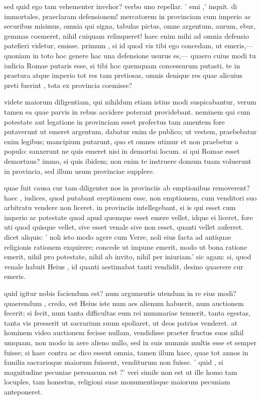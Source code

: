  sed quid ego tam vehementer invehor? verbo uno repellar. ' emi ,' inquit. di immortales, praeclaram defensionem! mercatorem in provinciam cum imperio ac securibus misimus, omnia qui signa, tabulas pictas, omne argentum, aurum, ebur, gemmas coemeret, nihil cuiquam relinqueret! haec enim mihi ad omnia defensio patefieri videtur, emisse. primum , si id quod vis tibi ego concedam, ut emeris,—quoniam in toto hoc genere hac una defensione usurus es,— quaero cuius modi tu iudicia Romae putaris esse, si tibi hoc quemquam concessurum putasti, te in praetura atque imperio tot res tam pretiosas, omnis denique res quae alicuius preti fuerint , tota ex provincia coemisse?

 videte maiorum diligentiam, qui nihildum etiam istius modi suspicabantur, verum tamen ea quae parvis in rebus accidere poterant providebant. neminem qui cum potestate aut legatione in provinciam esset profectus tam amentem fore putaverunt ut emeret argentum, dabatur enim de publico; ut vestem, praebebatur enim legibus; mancipium putarunt, quo et omnes utimur et non praebetur a populo: sanxerunt ne quis emeret nisi in demortui locum. si qui Romae esset demortuus? immo, si quis ibidem; non enim te instruere domum tuam voluerunt in provincia, sed illum usum provinciae supplere.

 quae fuit causa cur tam diligenter nos in provinciis ab emptionibus removerent? haec , iudices, quod putabant ereptionem esse, non emptionem, cum venditori suo arbitratu vendere non liceret. in provinciis intellegebant, si is qui esset cum imperio ac potestate quod apud quemque esset emere vellet, idque ei liceret, fore uti quod quisque vellet, sive esset venale sive non esset, quanti vellet auferret. dicet aliquis: ' noli isto modo agere cum Verre, noli eius facta ad antiquae religionis rationem exquirere; concede ut impune emerit, modo ut bona ratione emerit, nihil pro potestate, nihil ab invito, nihil per iniuriam.' sic agam: si, quod venale habuit Heius , id quanti aestimabat tanti vendidit, desino quaerere cur emeris.

 quid igitur nobis faciendum est? num argumentis utendum in re eius modi? quaerendum , credo, est Heius iste num aes alienum habuerit, num auctionem fecerit; si fecit, num tanta difficultas eum rei nummariae tenuerit, tanta egestas, tanta vis presserit ut sacrarium suum spoliaret, ut deos patrios venderet. at hominem video auctionem fecisse nullam, vendidisse praeter fructus suos nihil umquam, non modo in aere alieno nullo, sed in suis nummis multis esse et semper fuisse; si haec contra ac dico essent omnia, tamen illum haec, quae tot annos in familia sacrarioque maiorum fuissent, venditurum non fuisse. ' quid , si magnitudine pecuniae persuasum est ?' veri simile non est ut ille homo tam locuples, tam honestus, religioni suae monumentisque maiorum pecuniam anteponeret.

